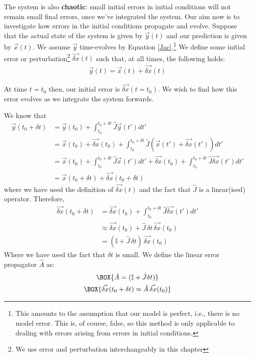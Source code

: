 The system is also \textbf{chaotic}: small initial errors in initial conditions will not remain small final errors, once we've integrated the system. Our aim now is to investigate how errors in the initial conditions propagate and evolve. Suppose that the actual state of the system is given by $\vec{y}(t)$ and our prediction is given by $\vec{x}(t)$. We assume $\vec{y}$ time-evolves by Equation \ref{Jac}.\footnote{This amounts to the assumption that our model is perfect, i.e., there is no model error. This is, of course, false, so this method is only applicable to dealing with errors arising from errors in initial conditions.} We define some initial error or perturbation\footnote{We use error and perturbation interchangeably in this chapter} $\vec{\delta x}(t)$ such that, at all times, the following holds:
\begin{align}
    \vec{y}(t)=\vec{x}(t)+\vec{\delta x}(t)
\end{align}

At time $t=t_0$ then, our initial error is $\vec{\delta x}(t=t_0)$. We wish to find how this error evolves as we integrate the system forwards.

We know that
\begin{align*}
    \vec{y}(t_0+\delta t) & = \vec{y}(t_0) + \int_{t_0}^{t_0+\delta t} \hat{J} \vec{y}(t') dt'\\
    & = \vec{x}(t_0) + \vec{\delta x}(t_0)+ \int_{t_0}^{t_0+\delta t} \hat{J} (\vec{x}(t') + \vec{\delta x}(t')) dt'\\
    & = \vec{x}(t_0) + \int_{t_0}^{t_0+\delta t} \hat{J} \vec{x}(t') dt'+ \vec{\delta x}(t_0)+ \int_{t_0}^{t_0+\delta t} \hat{J} \vec{\delta x}(t') dt'\\
    & = \vec{x}(t_0+\delta t) + \vec{\delta x}(t_0+\delta t)
\end{align*}
where we have used the definition of $\vec{\delta x}(t)$ and the fact that $\hat{J}$ is a linear(ised) operator. Therefore, 
\begin{align*}
    \vec{\delta x}(t_0+\delta t) & = \vec{\delta x}(t_0)+ \int_{t_0}^{t_0+\delta t} \hat{J} \vec{\delta x}(t') dt'\\
    & \approx \vec{\delta x}(t_0)+ \hat{J} \,\delta t\,\vec{\delta x}(t_0)
    \\
    & = (\mathbb{I} + \hat{J}\,\delta t)\,\vec{\delta x}(t_0)
\end{align*}
Where we have used the fact that $\delta t$ is small. We define the linear error propagator $\hat{A}$ as:
\begin{gather}
    \BOX{\hat{A} = (\mathbb{I} + \hat{J}\delta t)}
    \\
    \BOX{\vec{\delta x}(t_0+\delta t)\approx\hat{A}\,\vec{\delta x}(t_0)} \label{dx}
\end{gather}

